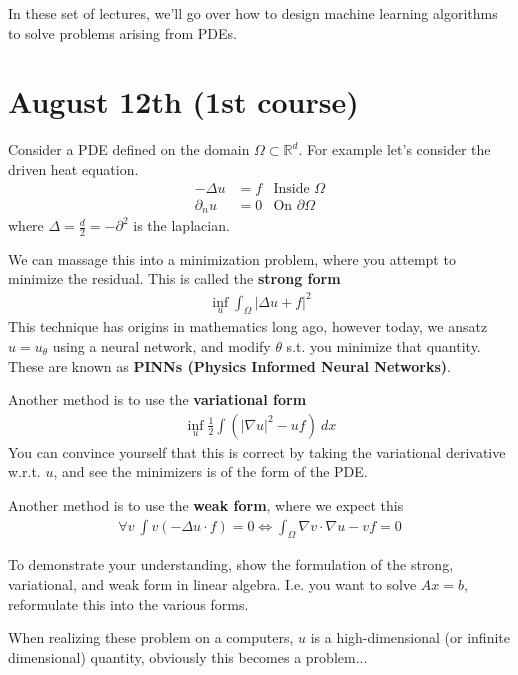In these set of lectures, we'll go over how to design machine learning algorithms to solve problems arising from PDEs.

\section{August 12th (1st course)}
Consider a PDE defined on the domain $\Omega \subset \mathbb R^d$. For example let's consider the driven heat equation.
\begin{align}
	-\Delta u &= f & \text{Inside } \Omega\\
	\partial_n u  &= 0 & \text{On } \partial \Omega
\end{align}
where $\Delta = \frac{d}{2} = - \partial^2$ is the laplacian.

We can massage this into a minimization problem, where you attempt to minimize the residual. This is called the \textbf{strong form}
\begin{align}
	\inf_u \int_\Omega |\Delta u + f|^2 
\end{align}
This technique has origins in mathematics long ago, however today, we ansatz $u=u_\theta$ using a neural network, and modify $\theta$ s.t. you minimize that quantity. These are known as \textbf{PINNs (Physics Informed Neural Networks)}.

Another method is to use the \textbf{variational form}
\begin{align}
	\inf_u \frac{1}{2} \int (|\nabla u|^2 - u f) ~dx 
\end{align}
You can convince yourself that this is correct by taking the variational derivative w.r.t. $u$, and see the minimizers is of the form of the PDE.

Another method is to use the \textbf{weak form}, where we expect this
\begin{align}
	\forall v~ \int v (-\Delta u \cdot f) = 0 \iff \int_\Omega \nabla v \cdot \nabla u - v f = 0
\end{align}

\begin{problem}
	To demonstrate your understanding, show the formulation of the strong, variational, and weak form in linear algebra. I.e. you want to solve $A x = b$, reformulate this into the various forms. 
\end{problem}

When realizing these problem on a computers, $u$ is a high-dimensional (or infinite dimensional) quantity, obviously this becomes a problem...

